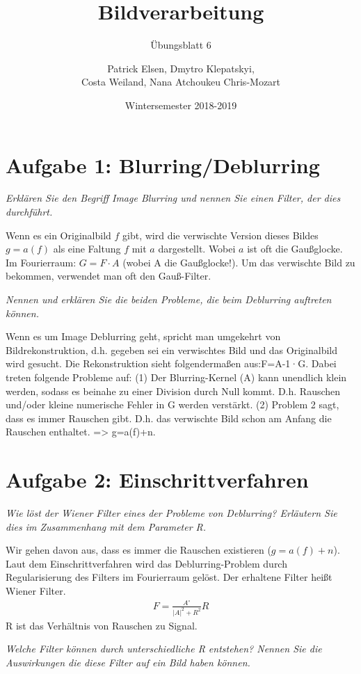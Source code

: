 \documentclass[
  ngerman,
  DIV=14
]{scrartcl}
\title{Bildverarbeitung}
\subtitle{Übungsblatt 6}
\author{Patrick Elsen, Dmytro Klepatskyi,\\Costa Weiland, Nana Atchoukeu Chris-Mozart}
\date{Wintersemester 2018-2019}
\begin{document}
\maketitle

\section*{Aufgabe 1: Blurring/Deblurring}

\emph{Erklären Sie den Begriff Image Blurring und nennen Sie einen Filter, der dies durchführt.}

Wenn es ein Originalbild $f$ gibt, wird die verwischte Version dieses Bildes $g = a(f)$ als eine Faltung $f$ mit $a$ dargestellt. Wobei $a$ ist oft die Gaußglocke. Im Fourierraum: $G = F \cdot A$ (wobei A die Gaußglocke!). Um das verwischte Bild zu bekommen, verwendet man oft den Gauß-Filter.

\emph{Nennen und erklären Sie die beiden Probleme, die beim Deblurring auftreten können.}

Wenn es um Image Deblurring geht, spricht man umgekehrt von Bildrekonstruktion, d.h. gegeben sei ein verwischtes Bild und das Originalbild wird gesucht.
Die Rekonstruktion sieht folgendermaßen aus:F=A-1·G.
Dabei treten folgende Probleme auf:
(1) Der Blurring-Kernel (A) kann unendlich klein werden, sodass es beinahe zu einer Division durch Null kommt. D.h. Rauschen und/oder kleine numerische Fehler in G werden verstärkt.
(2) Problem 2 sagt, dass es immer Rauschen gibt. D.h. das verwischte Bild schon am Anfang die Rauschen enthaltet. => g=a(f)+n.

\section*{Aufgabe 2: Einschrittverfahren}

\emph{Wie löst der Wiener Filter eines der Probleme von Deblurring? Erläutern Sie dies im Zusammenhang mit dem Parameter R.}

Wir gehen davon aus, dass es immer die Rauschen existieren ($g=a(f)+n$). Laut dem Einschrittverfahren wird das Deblurring-Problem durch Regularisierung des Filters im Fourierraum gelöst. Der erhaltene Filter heißt Wiener Filter.
\begin{align*}
F = \frac{A^\circ}{|A|^2+R^2}R  
\end{align*}
R ist das Verhältnis von Rauschen zu Signal.


\emph{Welche Filter können durch unterschiedliche R entstehen? Nennen Sie die Auswirkungen die diese Filter auf ein Bild haben können.}
\end{document}
